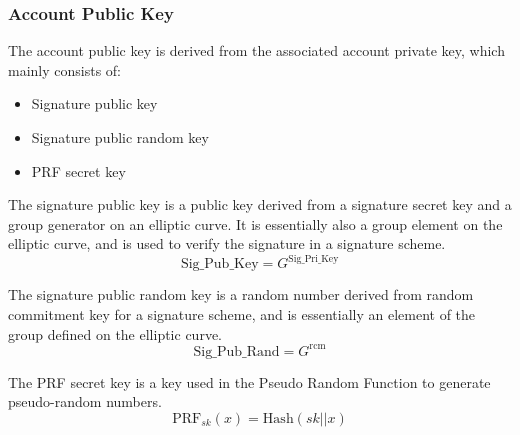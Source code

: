\subsubsection{Account Public Key}\label{section: account-public-key}

The account public key is derived from the associated account private key, which mainly consists of:

\begin{itemize}
    \item Signature public key
    \item Signature public random key
    \item PRF secret key
\end{itemize}

The signature public key is a public key derived from a signature secret key and a group generator on an elliptic curve. It is essentially also a group element on the elliptic curve, and is used to verify the signature in a signature scheme.
\[ \mathrm{Sig\_Pub\_Key} = G^{\mathrm{Sig\_Pri\_Key}} \]

The signature public random key is a random number derived from random commitment key for a signature scheme, and is essentially an element of the group defined on the elliptic curve.
\[ \mathrm{Sig\_Pub\_Rand} = G^{\mathrm{rcm}} \]

The PRF secret key is a key used in the Pseudo Random Function to generate pseudo-random numbers.
\[ \mathrm{PRF}_{sk}(x) = \mathrm{Hash}(sk \mathbin{||} x) \]
